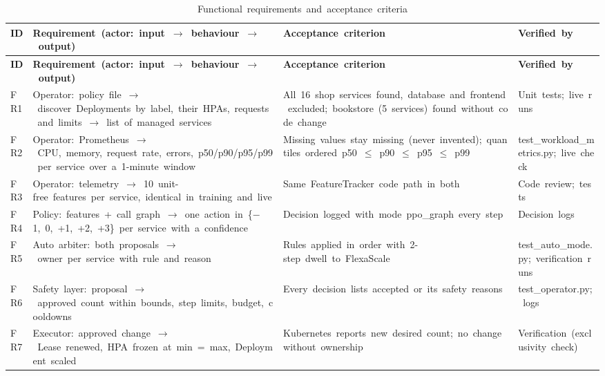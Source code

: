 \documentclass[12pt,a4paper,oneside]{report}
\begin{document}
\begingroup\small\setlength{\tabcolsep}{4pt}\renewcommand{\arraystretch}{1.25}
\begin{longtable}{|>{\raggedright\arraybackslash}p{1.00cm}|>{\raggedright\arraybackslash}p{6.40cm}|>{\raggedright\arraybackslash}p{4.27cm}|>{\raggedright\arraybackslash}p{2.56cm}|}
\caption{Functional~requirements~and~acceptance~criteria}\label{tab:fr}\\\hline
\textbf{ID} & \textbf{Requirement~(actor:~input~$\rightarrow$~behaviour~$\rightarrow$~output)} & \textbf{Acceptance~criterion} & \textbf{Verified~by}\\\hline\endfirsthead
\hline \textbf{ID} & \textbf{Requirement~(actor:~input~$\rightarrow$~behaviour~$\rightarrow$~output)} & \textbf{Acceptance~criterion} & \textbf{Verified~by}\\\hline\endhead
FR1 & Operator:~policy~file~$\rightarrow$~discover~Deployments~by~label,~their~HPAs,~requests~and~limits~$\rightarrow$~list~of~managed~services & All~16~shop~services~found,~database~and~frontend~excluded;~bookstore~(5~services)~found~without~code~change & Unit~tests;~live~runs\\\hline
FR2 & Operator:~Prometheus~$\rightarrow$~CPU,~memory,~request~rate,~errors,~p50/p90/p95/p99~per~service~over~a~1-minute~window & Missing~values~stay~missing~(never~invented);~quantiles~ordered~p50~$\le$~p90~$\le$~p95~$\le$~p99 & test\_workload\_metrics.py;~live~check\\\hline
FR3 & Operator:~telemetry~$\rightarrow$~10~unit-free~features~per~service,~identical~in~training~and~live & Same~FeatureTracker~code~path~in~both & Code~review;~tests\\\hline
FR4 & Policy:~features~+~call~graph~$\rightarrow$~one~action~in~\{$-$1,~0,~+1,~+2,~+3\}~per~service~with~a~confidence & Decision~logged~with~mode~ppo\_graph~every~step & Decision~logs\\\hline
FR5 & Auto~arbiter:~both~proposals~$\rightarrow$~owner~per~service~with~rule~and~reason & Rules~applied~in~order~with~2-step~dwell~to~FlexaScale & test\_auto\_mode.py;~verification~runs\\\hline
FR6 & Safety~layer:~proposal~$\rightarrow$~approved~count~within~bounds,~step~limits,~budget,~cooldowns & Every~decision~lists~accepted~or~its~safety~reasons & test\_operator.py;~logs\\\hline
FR7 & Executor:~approved~change~$\rightarrow$~Lease~renewed,~HPA~frozen~at~min~=~max,~Deployment~scaled & Kubernetes~reports~new~desired~count;~no~change~without~ownership & Verification~(exclusivity~check)\\\hline

\end{longtable}
\end{document}
